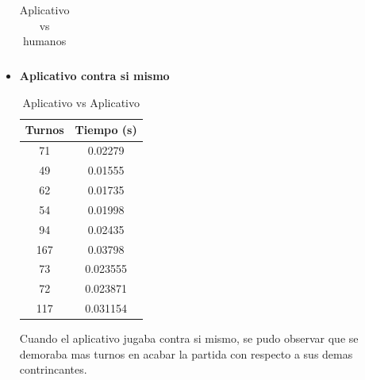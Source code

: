 \documentclass[12pt]{article}
\begin{document}
\begin{itemize}
\begin{table}[H]
\begin{tabular}{|c|c|c|}
                \end{tabular}
                \caption{Aplicativo vs humanos}
                \label{tab3}
            \end{table}
        
        
        \item\textbf{Aplicativo contra si mismo}
            \begin{table}[H]
                \centering
                \begin{tabular}{|c|c|}\hline
                \textbf{Turnos} & \textbf{Tiempo (s)}\\\hline
                    71 & 0.02279 \\ \hline
                    49 & 0.01555 \\ \hline                 
                    62 & 0.01735 \\ \hline
                    54 & 0.01998 \\ \hline               
                    94 & 0.02435 \\ \hline
                    167 & 0.03798 \\ \hline
                    73 & 0.023555 \\ \hline
                    72 & 0.023871 \\ \hline
                    117 & 0.031154 \\ \hline
                \end{tabular}
                \caption{Aplicativo vs Aplicativo}
                \label{tab3}
            \end{table}
            
        Cuando el aplicativo jugaba contra si mismo, se pudo observar que se demoraba mas turnos en acabar la partida con respecto a sus demas contrincantes.
    \end{itemize}
\end{document}
